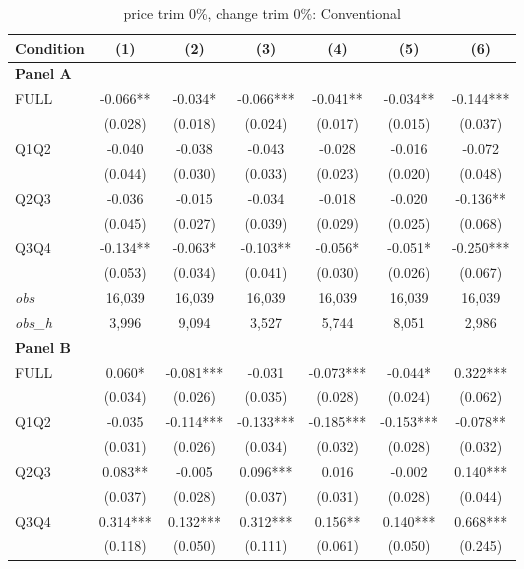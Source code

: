 \documentclass[10pt]{article}
\begin{document}
\begin{table}[!htbp]
\centering
\caption{price trim 0\%, change trim 0\%: Conventional}
\label{tab:abc:trim00:conventional}
\small
\begin{tabular}{lcccccc}
\toprule
Condition & (1) & (2) & (3) & (4) & (5) & (6) \\
\midrule
\textbf{Panel A} &&&&&&  \\

FULL & -0.066** & -0.034* & -0.066*** & -0.041** & -0.034** & -0.144*** \\
 & (0.028) & (0.018) & (0.024) & (0.017) & (0.015) & (0.037) \\
Q1Q2 & -0.040 & -0.038 & -0.043 & -0.028 & -0.016 & -0.072 \\
 & (0.044) & (0.030) & (0.033) & (0.023) & (0.020) & (0.048) \\
Q2Q3 & -0.036 & -0.015 & -0.034 & -0.018 & -0.020 & -0.136** \\
 & (0.045) & (0.027) & (0.039) & (0.029) & (0.025) & (0.068) \\
Q3Q4 & -0.134** & -0.063* & -0.103** & -0.056* & -0.051* & -0.250*** \\
 & (0.053) & (0.034) & (0.041) & (0.030) & (0.026) & (0.067) \\

\textit{obs} & 16,039 & 16,039 & 16,039 & 16,039 & 16,039 & 16,039 \\
\textit{obs\_h} & 3,996 & 9,094 & 3,527 & 5,744 & 8,051 & 2,986 \\

\textbf{Panel B} &&&&&&  \\

FULL & 0.060* & -0.081*** & -0.031 & -0.073*** & -0.044* & 0.322*** \\
 & (0.034) & (0.026) & (0.035) & (0.028) & (0.024) & (0.062) \\
Q1Q2 & -0.035 & -0.114*** & -0.133*** & -0.185*** & -0.153*** & -0.078** \\
 & (0.031) & (0.026) & (0.034) & (0.032) & (0.028) & (0.032) \\
Q2Q3 & 0.083** & -0.005 & 0.096*** & 0.016 & -0.002 & 0.140*** \\
 & (0.037) & (0.028) & (0.037) & (0.031) & (0.028) & (0.044) \\
Q3Q4 & 0.314*** & 0.132*** & 0.312*** & 0.156** & 0.140*** & 0.668*** \\
 & (0.118) & (0.050) & (0.111) & (0.061) & (0.050) & (0.245) \\


\end{tabular}
\end{table}
\end{document}
